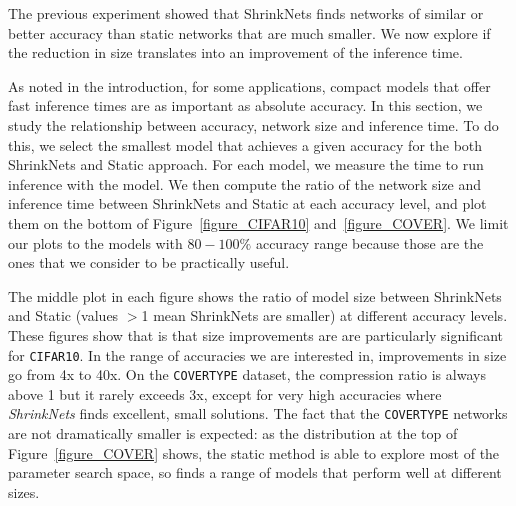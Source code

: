 The previous experiment showed that ShrinkNets finds networks of similar or better accuracy
than static networks that are much smaller. We now explore if the reduction in size
translates into an improvement of the inference time.


As noted in the introduction, for some applications, compact models that offer fast inference times
are as important as absolute accuracy. 
In this section, we study the relationship between accuracy, network size and inference time.
To do this, we select the smallest model 
that achieves a given accuracy for the both ShrinkNets and Static approach.
For each model, we measure the time to run inference with the model.  
We then compute the ratio of the network size and inference time
between ShrinkNets and Static at each accuracy level, and plot them on the bottom of 
 Figure~\ref{figure_CIFAR10} 
 and~\ref{figure_COVER}.
We limit our plots to the models with $80-100\%$
accuracy range because those are the ones that we consider to be practically useful.

 The middle plot in each figure shows the ratio of model size between ShrinkNets and Static (values $>$1 mean ShrinkNets are smaller) at different accuracy levels.  These figures show that is that size improvements are are particularly significant
for  \texttt{CIFAR10}. In the range of accuracies we are interested in,
improvements in size go from 4x to 40x. On the \texttt{COVERTYPE} dataset,
 the compression ratio is always above 1 but it rarely exceeds 3x, except for
very high accuracies where \textit{ShrinkNets} finds excellent, small
solutions.  The fact that the  \texttt{COVERTYPE} networks are not dramatically 
smaller is expected:  as the distribution at the top of Figure~\ref{figure_COVER} shows,
the static method is able to explore most of the parameter search space, so finds a range
of models that perform well at different sizes.

